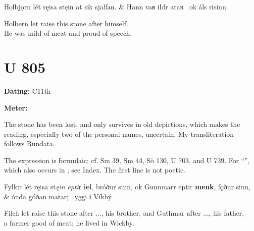 \sectionline

\bvg\bva[]%
Holbjǫrn lét ręisa stęin at sik sjalfan. &
Hann vaʀ ildr ataʀ \hld\ ok áls risinn.\eva

\bvb Holbern let raise this stone after himself. \\
He was mild of meat and proud of speech.\evb\evg

\sectionline

\section{U 805}

\begin{flushright}%
\textbf{Dating:} C11th

\textbf{Meter:} \Fornyrdislag
\end{flushright}%

The stone has been lost, and only survives in old depictions, which makes the reading, especially two of the personal names, uncertain.  My transliteration follows Rundata.

The expression is formulaic; cf. Sm 39, Sm 44, Sö 130, U 703, and U 739.  For “”, which also occurs in \Havamal; see Index.  The first line is not poetic.

\sectionline

\bvg\bva[]%
Fylkir lét ręisa st\emph{ęin epti}r \textbf{iel}, bróður sinn, ok Gunnmarr eptir \textbf{menk}, fǫður sinn, &
ónda góðan matar; \hld\ yggi í Víkbý.\eva

\bvb Filch let raise this stone after ..., his brother, and Guthmar after ..., his father, \\
a farmer good of meat; he lived in Wickby.\evb\evg

\sectionline
